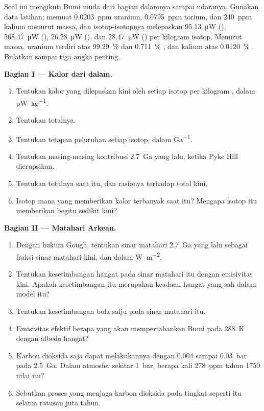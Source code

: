 \begin{problem}\label{pb:b2:precambrian-earth:1}
Soal ini mengikuti Bumi muda dari bagian dalamnya sampai udaranya. Gunakan data
latihan;  memuat \qty{0.0203}{ppm} uranium, \qty{0.0795}{ppm}
torium, dan \qty{240}{ppm} kalium menurut massa, dan isotop-isotopnya melepaskan \qty{95.13}{\micro W}
(), \qty{568.47}{\micro W} (), \qty{26.28}{\micro W} (), dan
\qty{28.47}{\micro W} () per kilogram isotop. Menurut massa, uranium terdiri atas
\qty{99.29}{\percent}  dan \qty{0.711}{\percent} , dan kalium atas
\qty{0.0120}{\percent} . Bulatkan sampai tiga angka penting.

\noindent\textbf{Bagian I --- Kalor dari dalam.}
\begin{enumerate}
  \item Tentukan kalor yang dilepaskan kini oleh setiap isotop per kilogram , dalam
        \unit{pW.kg^{-1}}.
  \item Tentukan totalnya.
  \item Tentukan tetapan peluruhan setiap isotop, dalam \unit{Ga^{-1}}.
  \item Tentukan masing-masing kontribusi \qty{2.7}{Ga} yang lalu, ketika  Pyke Hill dierupsikan.
  \item Tentukan totalnya saat itu, dan rasionya terhadap total kini.
  \item Isotop mana yang memberikan kalor terbanyak saat itu? Mengapa isotop itu memberikan begitu sedikit kini?
\end{enumerate}

\noindent\textbf{Bagian II --- Matahari Arkean.}
\begin{enumerate}[resume]
  \item Dengan hukum Gough, tentukan sinar matahari \qty{2.7}{Ga} yang lalu sebagai fraksi sinar matahari kini, dan dalam
        \unit{W.m^{-2}}.
  \item Tentukan kesetimbangan hangat pada sinar matahari itu dengan emisivitas kini. Apakah kesetimbangan itu merupakan keadaan hangat
        yang sah dalam model itu?
  \item Tentukan kesetimbangan bola salju pada sinar matahari itu.
  \item Emisivitas efektif berapa yang akan mempertahankan Bumi pada \qty{288}{K} dengan albedo hangat?
  \item Karbon dioksida saja dapat melakukannya dengan 0.004 sampai \qty{0.03}{bar} pada \qty{2.5}{Ga}.
        Dalam atmosfer sekitar \qty{1}{bar}, berapa kali \qty{278}{ppm} tahun 1750 nilai
        itu?
  \item Sebutkan proses yang menjaga karbon dioksida pada tingkat seperti itu selama ratusan juta
        tahun.
\end{enumerate}


\end{problem}
